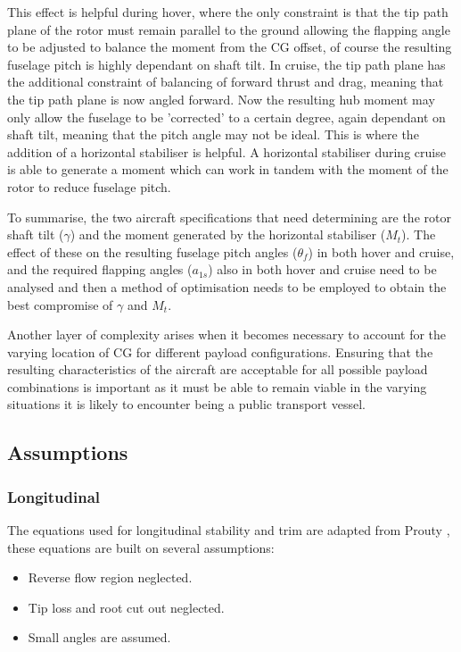 \documentclass[11pt,a4paper]{article}
\begin{document}
This effect is helpful during hover, where the only constraint is that the tip path plane of the rotor must remain parallel to the ground allowing the flapping angle to be adjusted to balance the moment from the CG offset, of course the resulting fuselage pitch is highly dependant on shaft tilt. In cruise, the tip path plane has the additional constraint of balancing of forward thrust and drag, meaning that the tip path plane is now angled forward. Now the resulting hub moment may only allow the fuselage to be 'corrected' to a certain degree, again dependant on shaft tilt, meaning that the pitch angle may not be ideal. This is where the addition of a horizontal stabiliser is helpful. A horizontal stabiliser during cruise is able to generate a moment which can work in tandem with the moment of the rotor to reduce fuselage pitch.

To summarise, the two aircraft specifications that need determining are the rotor shaft tilt ($\gamma$) and the moment generated by the horizontal stabiliser ($M_t$). The effect of these on the resulting fuselage pitch angles ($\theta_f$) in both hover and cruise, and the required flapping angles ($a_{1s}$) also in both hover and cruise need to be analysed and then a method of optimisation needs to be employed to obtain the best compromise of $\gamma$ and $M_t$.

Another layer of complexity arises when it becomes necessary to account for the varying location of CG for different payload configurations. Ensuring that the resulting characteristics of the aircraft are acceptable for all possible payload combinations is important as it must be able to remain viable in the varying situations it is likely to encounter being a public transport vessel.
\subsection{Assumptions}
\subsubsection{Longitudinal}
The equations used for longitudinal stability and trim are adapted from Prouty \cite{prouty}, these equations are built on several assumptions:

\begin{itemize}
    \item Reverse flow region neglected.
    \item Tip loss and root cut out neglected.
    \item Small angles are assumed.
\end{itemize}{}
\end{document}
